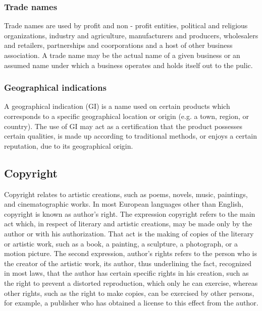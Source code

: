\documentclass[a4paper,11pt]{article}
\begin{document}
\subsubsection{Trade names}
Trade names are used by profit and non - profit  entities, political and
religious organizations, industry and agriculture, manufacturers and producers,
wholesalers and retailers, partnerships and coorporations and a host of other
business association. A trade name may be the actual name of a given business
or an assumed name under which a business operates and holds itself out to the
pulic.\cite{tradename}

\subsubsection{Geographical indications}
A geographical indication (GI) is a name used on certain products which
corresponds to a specific geographical location or origin (e.g. a town, region,
or country). The use of GI may act as a certification that the product
possesses certain qualities, is made up according to traditional methods, or
enjoys a certain reputation, due to its geographical
origin.\cite{geographicalindications}

\subsection{Copyright}
Copyright relates to artistic creations, such as poems, novels, music,
paintings, and cinematographic works. In most European languages other than
English, copyright is known as author's right. The expression copyright refers to the main
act which, in respect of literary and artistic creations, may be made only by the
author or with his authorization. That act is the making of copies of the literary
or artistic work, such as a book, a painting, a sculpture, a photograph, or a
motion picture. The second expression, author’s rights refers to the person who 
is the creator of the artistic work, its author, thus underlining the fact, recognized
in most laws, that the author has certain specific rights in his creation, such as 
the right to prevent a distorted reproduction, which only he can exercise, whereas
other rights, such as the right to make copies, can be exercised by other persons,
for example, a publisher who has obtained a license to this effect from the author.

\clearpage
\newpage 
\end{document}

